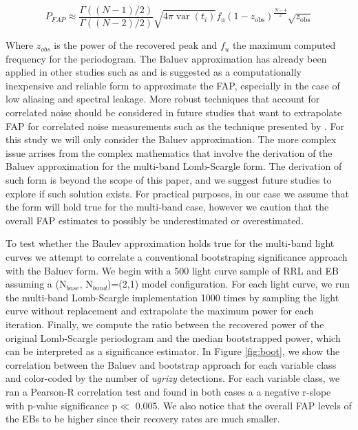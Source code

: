 \documentclass[DM,authoryear,toc]{lsstdoc}
\begin{document}
\begin{equation}
P_{FAP} \approx \frac{\Gamma((N-1) / 2)}{\Gamma((N-2) / 2)} \sqrt{4 \pi \operatorname{var}\left(t_i\right)} f_{\mathrm{u}}\left(1-z_{\mathrm{obs}}\right)^{\frac{N-4}{2}} \sqrt{z_{\mathrm{obs}}}
\end{equation}

Where $z_{obs}$ is the power of the recovered peak and $f_u$ the maximum computed frequency for the periodogram.
The Baluev approximation has already been applied in other studies such as \citet{Suveges:Suveges15} and is suggested as a computationally inexpensive and reliable form to approximate the FAP, especially in the case of low aliasing and spectral leakage. More robust techniques that account for correlated noise should be considered in future studies that want to extrapolate FAP for correlated noise measurements such as the technique presented by \cite{2020A&A...635A..83D}. For this study we will only consider the Baluev approximation.
The more complex issue arrises from the complex mathematics that involve the derivation of the Baluev approximation for the multi-band Lomb-Scargle form.
The derivation of such form is beyond the scope of this paper, and we suggest future studies to explore if such solution exists.
For practical purposes, in our case we assume that the \citet{Baluev:Baluev2008}  form will hold true for the multi-band case, however we caution that the overall FAP estimates to possibly be underestimated or overestimated.

To test whether the Baulev approximation holds true for the multi-band light curves we attempt to correlate a conventional bootstraping significance approach with the Baluev form.
We begin with a 500 light curve sample of RRL and EB assuming a (N$_{base}$, N$_{band}$)=(2,1) model configuration.
For each light curve, we run the multi-band Lomb-Scargle implementation 1000 times by sampling the light curve without replacement and extrapolate the maximum power for each iteration.
Finally, we compute the ratio between the recovered power of the original Lomb-Scargle periodogram and the median bootstrapped power, which can be interpreted as a significance estimator.
In Figure \ref{fig:boot}, we show the correlation between the Baluev and bootstrap approach for each variable class and color-coded by the number of \textit{ugrizy} detections.
For each variable class, we ran a Pearson-R correlation test and found in both cases a a negative r-slope with p-value significance p$\ll$ 0.005.
We also notice that the overall FAP levels of the EBs to be higher since their recovery rates are much smaller.
\end{document}
